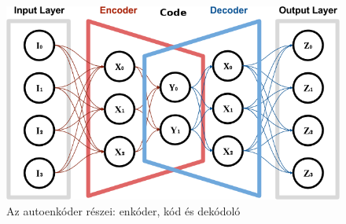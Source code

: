 
  


\begin{figure}[ht]
	\centering
	\includegraphics[width=0.8\columnwidth]{figures/autoenc.png}
	\caption{Az autoenkóder részei: enkóder, kód és dekódoló}
	\label{fig:autoenc_struct}
\end{figure}


